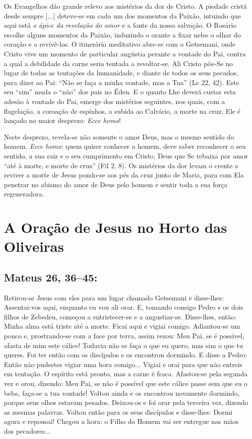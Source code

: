 \documentclass[10pt,a5paper]{book}
\newcommand{\from}[1]{\subsection*{#1}}
\begin{document}
Os Evangelhos dão grande relevo aos mistérios da dor de Cristo.
A piedade cristã desde sempre [...] deteve-se em cada um dos momentos da Paixão, intuindo que aqui está \emph{o ápice da revelação do amor} e a fonte da nossa salvação.
O Rosário escolhe alguns momentos da Paixão, induzindo o orante a fixar neles o olhar do coração e a revivê-los.
O itinerário meditativo abre-se com o Getsemani, onde Cristo vive um momento de particular angústia perante a vontade do Pai, contra a qual a debilidade da carne seria tentada a revoltar-se.
Ali Cristo põe-Se no lugar de todas as tentações da humanidade, e diante de todos os seus pecados, para dizer ao Pai:
``Não se faça a minha vontade, mas a Tua'' (Lc 22, 42).
Este seu ``sim'' muda o ``não'' dos pais no Éden.
E o quanto Lhe deverá custar esta adesão à vontade do Pai, emerge dos mistérios seguintes, nos quais, com a flagelação, a coroação de espinhos, a subida ao Calvário, a morte na cruz, Ele é lançado no maior desprezo:
\emph{Ecce homo}!

Neste desprezo, revela-se não somente o amor Deus, mas o mesmo sentido do homem.
\emph{Ecce homo}: quem quiser conhecer o homem, deve saber reconhecer o seu sentido, a sua raiz e o seu cumprimento em Cristo, Deus que Se rebaixa por amor ``até à morte, e morte de cruz'' (Fil 2, 8).
Os mistérios da dor levam o crente a reviver a morte de Jesus pondo-se aos pés da cruz junto de Maria, para com Ela penetrar no abismo do amor de Deus pelo homem e sentir toda a sua força regeneradora.


\section{A Oração de Jesus no Horto das Oliveiras}

\from{Mateus 26, 36--45:}

Retirou-se Jesus com eles para um lugar chamado Getsemani e disse-lhes: Assentai-vos aqui, enquanto eu vou ali orar.
E, tomando consigo Pedro e os dois filhos de Zebedeu, começou a entristecer-se e a angustiar-se.
Disse-lhes, então: Minha alma está triste até a morte. Ficai aqui e vigiai comigo.
Adiantou-se um pouco e, prostrando-se com a face por terra, assim rezou: Meu Pai, se é possível, afasta de mim este cálice! Todavia não se faça o que eu quero, mas sim o que tu queres.
Foi ter então com os discípulos e os encontrou dormindo. E disse a Pedro: Então não pudestes vigiar uma hora comigo...
Vigiai e orai para que não entreis em tentação. O espírito está pronto, mas a carne é fraca.
Afastou-se pela segunda vez e orou, dizendo: Meu Pai, se não é possível que este cálice passe sem que eu o beba, faça-se a tua vontade!
Voltou ainda e os encontrou novamente dormindo, porque seus olhos estavam pesados.
Deixou-os e foi orar pela terceira vez, dizendo as mesmas palavras.
Voltou então para os seus discípulos e disse-lhes: Dormi agora e repousai! Chegou a hora: o Filho do Homem vai ser entregue nas mãos dos pecadores...
\end{document}
